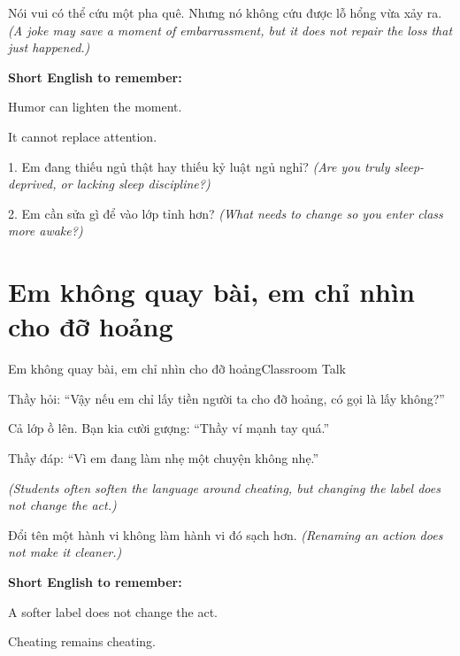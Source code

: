 \begin{baihoc}
Nói vui có thể cứu một pha quê. Nhưng nó không cứu được lỗ hổng vừa xảy ra.
\textit{(A joke may save a moment of embarrassment, but it does not repair the loss that just happened.)}
\end{baihoc}

\begin{ghinhoanh}
\textbf{Short English to remember:}

Humor can lighten the moment.

It cannot replace attention.
\end{ghinhoanh}

\begin{tuhocnhanh}
1. Em đang thiếu ngủ thật hay thiếu kỷ luật ngủ nghỉ? \textit{(Are you truly sleep-deprived, or lacking sleep discipline?)}

2. Em cần sửa gì để vào lớp tỉnh hơn? \textit{(What needs to change so you enter class more awake?)}
\end{tuhocnhanh}
\ngancach

\section{Em không quay bài, em chỉ nhìn cho đỡ hoảng}
\begin{truyen}{Em không quay bài, em chỉ nhìn cho đỡ hoảng}{Classroom Talk}

Thầy hỏi: ``Vậy nếu em chỉ lấy tiền người ta cho đỡ hoảng, có gọi là lấy không?''

Cả lớp ồ lên. Bạn kia cười gượng: ``Thầy ví mạnh tay quá.''

Thầy đáp: ``Vì em đang làm nhẹ một chuyện không nhẹ.''

\textit{(Students often soften the language around cheating, but changing the label does not change the act.)}
\end{truyen}

\begin{baihoc}
Đổi tên một hành vi không làm hành vi đó sạch hơn.
\textit{(Renaming an action does not make it cleaner.)}
\end{baihoc}

\begin{ghinhoanh}
\textbf{Short English to remember:}

A softer label does not change the act.

Cheating remains cheating.
\end{ghinhoanh}

